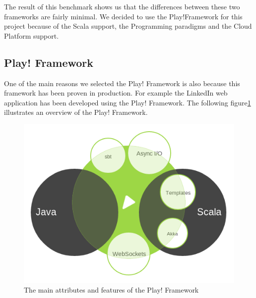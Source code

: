 The result of this benchmark shows us that the differences between these two frameworks are fairly minimal. We decided to use the Play!Framework for this project because of the Scala support, the Programming paradigms and the Cloud Platform support.
\newpage

\subsection{Play! Framework}
  One of the main reasons we selected the Play! Framework is also because this framework has been proven in production. For example the LinkedIn web application has been developed using the Play! Framework. The following figure\ref{play} illustrates an overview of the Play! Framework.\\
\begin{figure}[h!]
\centering
\includegraphics[scale=0.5]{./img/play.png}
\caption{\small{The main attributes and features of the Play! Framework}}
\label{play}
\end{figure}
 
